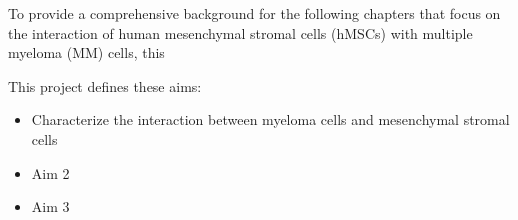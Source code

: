 \documentclass[12pt]{doctoral_thesis_uniwue}
\begin{document}





\newpage


\setcounter{page}{1} %



\newpage



\newpage


{\footnotesize \tableofcontents}
\newpage





\setcounter{page}{1} %

To provide a comprehensive background for the following chapters that focus on
the interaction of human mesenchymal stromal cells (hMSCs) with multiple myeloma
(MM) cells, this





\newpage


This project defines these aims:


\begin{itemize}
    \item Characterize the interaction between myeloma cells and mesenchymal stromal cells
    \item Aim 2
    \item Aim 3

\end{itemize}
\end{document}
